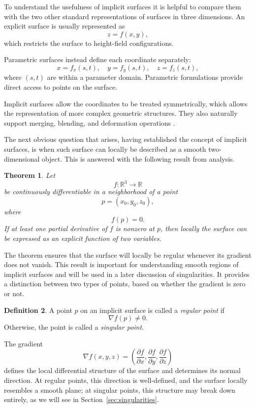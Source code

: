 \documentclass[12pt, a4paper, oneside]{book}
\theoremstyle{plain}
\newtheorem{theorem}{Theorem}[chapter]
\theoremstyle{definition}
\newtheorem{definition}[theorem]{Definition}
\theoremstyle{remark}
\theoremstyle{definition}
\begin{document}
To understand the usefulness of implicit surfaces it is helpful to compare them with the two other standard representations of surfaces in three dimensions. An explicit surface is
usually represented as
\[
z=f(x,y),
\]
which restricts the surface to height-field configurations. 

Parametric surfaces instead define each coordinate separately:
\[
x=f_x(s,t), \quad y=f_y(s,t), \quad z=f_z(s,t),
\]
where $(s,t)$ are within a parameter domain. Parametric formulations provide direct access to points on the surface.

Implicit surfaces allow the coordinates to be treated symmetrically, which allows the representation of more complex geometric structures. They also naturally support merging, blending, and deformation operations \cite{bloomenthal2000implicit}.

The next obvious question that arises, having established the concept of implicit surfaces, is when such surface can locally be described as a smooth two-dimensional object. This is answered with the following result from analysis.

\begin{theorem}
Let
\[
f : \mathbb{R}^3 \to \mathbb{R}
\]
be continuously differentiable in a neighborhood of a point
\[
p=(x_0,y_0,z_0),
\]
where
\[
f(p)=0.
\]
If at least one partial derivative of $f$ is nonzero at $p$, then locally the surface can
be expressed as an explicit function of two variables.
\end{theorem}

The theorem ensures that the surface will locally be regular whenever its gradient does not vanish. This result is important for understanding smooth regions of implicit surfaces and will be used in a later discussion of singularities. It provides a distinction between two types of points, based on whether the gradient is zero or not.

\begin{definition}
A point $p$ on an implicit surface is called a \emph{regular point} if
\[
\nabla f(p)\neq 0.
\]
Otherwise, the point is called a \emph{singular point}.
\end{definition}

The gradient
\[
\nabla f(x,y,z)=
\left(
\frac{\partial f}{\partial x},
\frac{\partial f}{\partial y},
\frac{\partial f}{\partial z}
\right)
\]
defines the local differential structure of the surface and determines its normal direction. At regular points, this direction is well-defined, and the surface locally resembles a smooth plane; at singular points, this structure may break down entirely, as we will see in Section~\ref{sec:singularities}.
\end{document}
